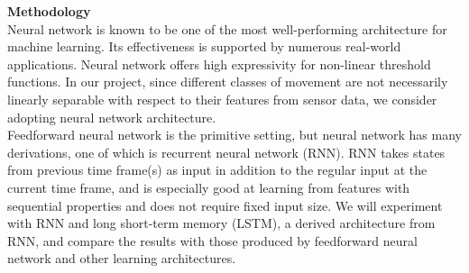\documentclass{article}
\begin{document}
\textbf{Methodology} \\

Neural network is known to be one of the most well-performing architecture for machine learning. Its effectiveness is supported by numerous real-world applications. Neural network offers high expressivity for non-linear threshold functions. In our project, since different classes of movement are not necessarily linearly separable with respect to their features from sensor data, we consider adopting neural network architecture. \\

Feedforward neural network is the primitive setting, but neural network has many derivations, one of which is recurrent neural network (RNN). RNN takes states from previous time frame(s) as input in addition to the regular input at the current time frame, and is especially good at learning from features with sequential properties and does not require fixed input size. We will experiment with RNN and long short-term memory (LSTM), a derived architecture from RNN, and compare the results with those produced by feedforward neural network and other learning architectures. 
\end{document}
